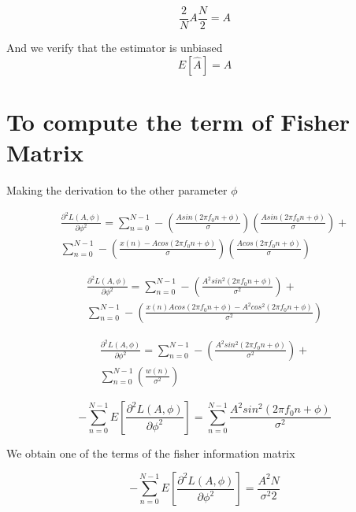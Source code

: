 \documentclass{report}
\begin{document}
\begin{equation}
\frac{2}{N} A \frac{N}{2} = A
\end{equation}

And we verify that the estimator is unbiased
\begin{equation}
E[\hat{A}] = A
\end{equation}




\section{To compute the term of Fisher Matrix}
Making the derivation to the other parameter $ \phi $

\begin{gather*}\label{key}
\frac{\partial^2 L(A,\phi)}{\partial \phi^2} = \sum_{n=0}^{N-1} - 
(\frac{Asin(2\pi f_0 n +\phi)}{\sigma}) (\frac{Asin(2\pi f_0 n 
	+\phi)}{\sigma})+\\
\sum_{n=0}^{N-1} - (\frac{x(n)-Acos(2\pi f_0 n +\phi)}{\sigma}) 
(\frac{Acos(2\pi f_0 n +\phi)}{\sigma})
\end{gather*}


\begin{gather*}\label{key}
\frac{\partial^2 L(A,\phi)}{\partial \phi^2} = \sum_{n=0}^{N-1} - 
(\frac{A^2sin^2(2\pi f_0 n +\phi)}{\sigma^2})+\\
\sum_{n=0}^{N-1} - (\frac{x(n)Acos(2\pi f_0 n +\phi)-A^2cos^2(2\pi f_0 n 
	+\phi)}{\sigma^2})
\end{gather*}


\begin{gather*}\label{key}
\frac{\partial^2 L(A,\phi)}{\partial \phi^2} = \sum_{n=0}^{N-1} - 
(\frac{A^2sin^2(2\pi f_0 n +\phi)}{\sigma^2})+\\
\sum_{n=0}^{N-1} (\frac{w(n)}{\sigma^2})
\end{gather*}

\begin{equation}\label{key}
-\sum_{n=0}^{N-1} E[\frac{\partial^2 L(A,\phi)}{\partial \phi^2}] = 
\sum_{n=0}^{N-1}\frac{A^2sin^2(2\pi f_0 n +\phi)}{\sigma^2}
\end{equation}

We obtain one of the terms of the fisher information matrix

\begin{equation}\label{key}
-\sum_{n=0}^{N-1} E[\frac{\partial^2 L(A,\phi)}{\partial \phi^2}] = 
\frac{A^2N}{\sigma^2 2}
\end{equation} 
\end{document}
